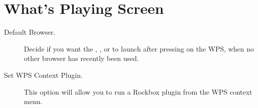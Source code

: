 
\section{\label{ref:WPSSettings}What's Playing Screen}

  \begin{description}
  \item[Default Browser.]
  Decide if you want the , , or
   to launch after pressing \ActionWpsBrowse{}
  on the WPS, when no other browser has recently been used.
  \item[Set WPS Context Plugin.]
  This option will allow you to run a Rockbox plugin from the WPS context menu.
   \end{description}
